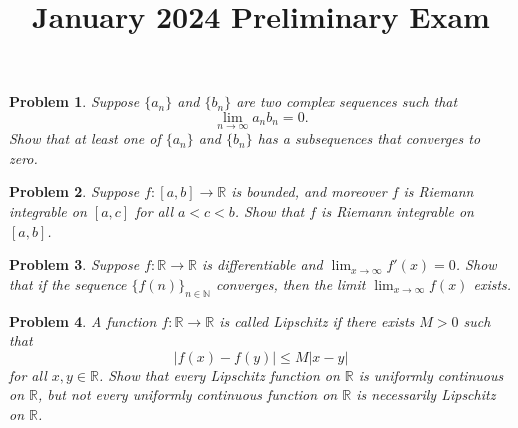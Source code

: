 \documentclass[11pt,twoside]{amsart}
\title{January 2024 Preliminary Exam}
\author{}
\theoremstyle{plain}
\newtheorem{prob}{Problem}
\newcommand{\RR}{\mathbb{R}}
\newcommand{\NN}{\mathbb{N}}
\begin{document}
\maketitle

\begin{prob}
  Suppose $\{a_n\}$ and $\{b_n\}$ are two complex sequences such that 
  \begin{equation*}
    \lim_{n \to \infty}{a_n b_n} = 0.
  \end{equation*}
  Show that at least one of $\{a_n\}$ and $\{b_n\}$ has a subsequences that converges to zero.
\end{prob}

\begin{prob}
  Suppose $f: [a,b] \to \RR$ is bounded, and moreover $f$ is Riemann integrable on $[a,c]$
  for all $a < c < b$. Show that $f$ is Riemann integrable on $[a,b]$. 
\end{prob}
    
\begin{prob}
  Suppose $f: \RR \to \RR$ is differentiable and $\lim_{x \to \infty} f'(x) = 0$. Show that 
  if the sequence $\{f(n)\}_{n \in \NN}$ converges, then the limit $\lim_{x \to \infty} f(x)$ exists. 
\end{prob}

\begin{prob}
  A function $f: \RR \to \RR$ is called Lipschitz if there exists $M > 0$ such that 
  \begin{equation*}
    |f(x) - f(y)| \leq M|x-y|
  \end{equation*}
  for all $x,y \in \RR$. Show that every Lipschitz function on $\RR$ is uniformly continuous on $\RR$,
  but not every uniformly continuous function on $\RR$ is necessarily Lipschitz on $\RR$. 
\end{prob}
\end{document}
